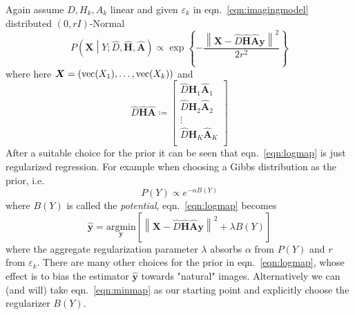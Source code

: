 %
Again assume $D, H_k, A_k$ linear and given $\varepsilon_k$ in eqn.~\ref{eqn:imagingmodel} distributed $(0, rI)$-Normal
\begin{equation}
    P\left(\bm{X} \middle| Y; \hat{D},  \hat{\bm{H}}, \hat{\bm{A}} \right) \propto \exp \left\{ -\frac{\left\| \bm{X} - \hat{D} \hat{\bm{H}} \hat{\bm{A}} \bm{y} \right\|^2}{2r^2} \right\}
\end{equation}
where here $\bm{X} = \left( \text{vec}(X_1), \mathellipsis, \text{vec}(X_k) \right)$ and
\begin{equation}
    \hat{D} \hat{\bm{H}} \hat{\bm{A}} \coloneqq \begin{bmatrix}
                                                    \hat{D} \hat{\bm{H}}_1 \hat{\bm{A}}_1 \\
                                                    \hat{D} \hat{\bm{H}}_2 \hat{\bm{A}}_2 \\
                                                    \vdots \\
                                                    \hat{D} \hat{\bm{H}}_K \hat{\bm{A}}_K \\
    \end{bmatrix}
\end{equation}
%
After a suitable choice for the prior it can be seen that eqn.~\ref{eqn:logmap} is just regularized regression.
%
For example when choosing a Gibbs\cite{Hardie1997} distribution as the prior, i.e.
\begin{equation}
    P(Y) \propto e^{-\alpha B(Y)}
    \label{eqn:gibbs}
\end{equation}
where $B(Y)$ is called the \textit{potential}, eqn.~\ref{eqn:logmap} becomes
\begin{equation}
    \hat{\bm{y}} = \underset{\bm{y}}{\text{argmin}}\left[ \left\| \bm{X} - \hat{D} \hat{\bm{H}} \hat{\bm{A}} \bm{y} \right\|^2 +\lambda B(Y)\right]
    \label{eqn:minmap}
\end{equation}
where the aggregate regularization parameter $\lambda$ absorbs $\alpha$ from $P(Y)$ and $r$ from $\varepsilon_k$.
%
There are many other choices for the prior in eqn.~\ref{eqn:logmap}, whose effect is to bias the estimator $\hat{\bm{y}}$ towards "natural" images.
%
Alternatively we can (and will) take eqn.~\ref{eqn:minmap} as our starting point and explicitly choose the regularizer $B(Y)$.

